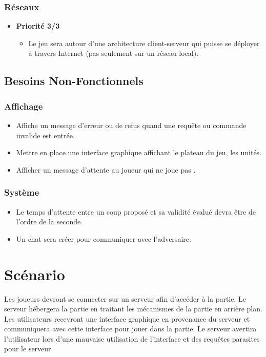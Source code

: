 \subsubsection{Réseaux}
\begin{itemize}
    \item \textbf{Priorité 3/3}
    \begin{itemize}
        \item Le jeu sera autour d'une architecture client-serveur qui puisse se déployer à travers Internet (pas seulement sur un réseau local).\cmark
    \end{itemize}
\end{itemize}

\subsection{Besoins Non-Fonctionnels}

\subsubsection{Affichage}
\begin{itemize}
    \item Affiche un message d'erreur ou de refus quand une requête ou commande invalide est entrée.\cmark
    \item Mettre en place une interface graphique affichant le plateau du jeu, les unités.\cmark
    \item Afficher un message d'attente au joueur  qui ne joue pas .\cmark
\end{itemize}

\subsubsection{Système}
\begin{itemize}
    \item Le temps d'attente entre un coup proposé et sa validité évalué devra être de l'ordre de la seconde.\cmark
    \item Un chat sera créer pour communiquer avec l'adversaire.\cmark
\end{itemize}

\section{Scénario}

Les joueurs devront se connecter sur un serveur afin d'accéder à la partie. Le serveur hébergera la partie en traitant les mécanismes de la partie en arrière plan. Les utilisateurs recevront une interface graphique en provenance du serveur et communiquera avec cette interface pour jouer dans la partie.
Le serveur avertira l'utilisateur lors d'une mauvaise utilisation de l'interface et des requêtes parasites pour le serveur.


